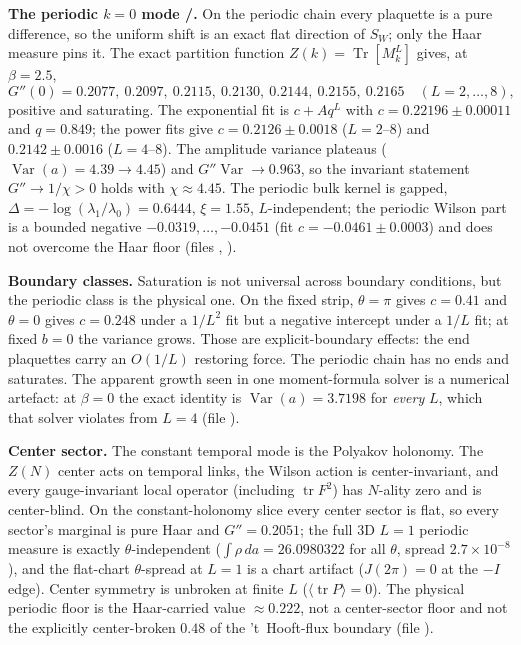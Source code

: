 \textbf{The periodic $k=0$ mode \LT/\LE.} On the periodic chain every plaquette is a pure difference,
so the uniform shift is an exact flat direction of $S_W$; only the Haar measure pins it. The exact
partition function $Z(k)=\operatorname{Tr}[M_k^L]$ gives, at $\beta=2.5$,
\begin{equation}
  G''(0)=0.2077,\ 0.2097,\ 0.2115,\ 0.2130,\ 0.2144,\ 0.2155,\ 0.2165
  \quad (L=2,\dots,8),
  \label{eq:v3periodic}
\end{equation}
positive and saturating. The exponential fit is $c+Aq^L$ with $c=0.22196\pm0.00011$ and $q=0.849$;
the power fits give $c=0.2126\pm0.0018$ ($L=2$--$8$) and $0.2142\pm0.0016$ ($L=4$--$8$). The
amplitude variance plateaus ($\operatorname{Var}(a)=4.39\to4.45$) and $G''\operatorname{Var}\to0.963$,
so the invariant statement $G''\to1/\chi>0$ holds with $\chi\approx4.45$. The periodic bulk kernel is
gapped, $\Delta=-\log(\lambda_1/\lambda_0)=0.6444$, $\xi=1.55$, $L$-independent; the periodic Wilson
part is a bounded negative $-0.0319,\dots,-0.0451$ (fit $c=-0.0461\pm0.0003$) and does not overcome
the Haar floor (files , ).

\textbf{Boundary classes.} Saturation is not universal across boundary conditions, but the periodic
class is the physical one. On the fixed strip, $\theta=\pi$ gives $c=0.41$ and $\theta=0$ gives
$c=0.248$ under a $1/L^2$ fit but a negative intercept under a $1/L$ fit; at fixed $b=0$ the variance
grows. Those are explicit-boundary effects: the end plaquettes carry an $O(1/L)$ restoring force. The
periodic chain has no ends and saturates. The apparent growth seen in one moment-formula solver is a
numerical artefact: at $\beta=0$ the exact identity is $\operatorname{Var}(a)=3.7198$ for \emph{every}
$L$, which that solver violates from $L=4$ (file ).

\textbf{Center sector.} The constant temporal mode is the Polyakov holonomy. The $Z(N)$ center acts
on temporal links, the Wilson action is center-invariant, and every gauge-invariant local operator
(including $\operatorname{tr}F^2$) has $N$-ality zero and is center-blind. On the constant-holonomy
slice every center sector is flat, so every sector's marginal is pure Haar and $G''=0.2051$; the full
$3$D $L=1$ periodic measure is exactly $\theta$-independent
($\int\rho\,da=26.0980322$ for all $\theta$, spread $2.7\times10^{-8}$), and the flat-chart
$\theta$-spread at $L=1$ is a chart artifact ($J(2\pi)=0$ at the $-I$ edge). Center symmetry is
unbroken at finite $L$ ($\langle\operatorname{tr}P\rangle=0$). The physical periodic floor is the
Haar-carried value $\approx0.222$, not a center-sector floor and not the explicitly center-broken
$0.48$ of the 't~Hooft-flux boundary (file ).

